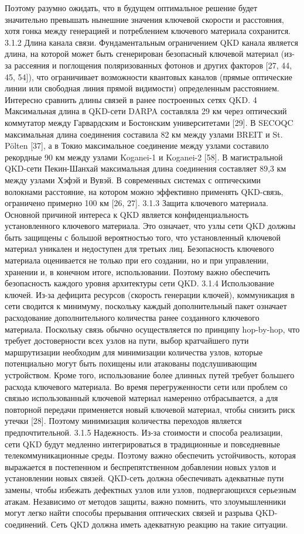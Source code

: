 Поэтому разумно ожидать, что в будущем оптимальное решение будет значительно превышать нынешние значения ключевой скорости и расстояния, хотя гонка между генерацией и потреблением ключевого материала сохранится.
3.1.2 Длина канала связи. Фундаментальным ограничением QKD канала является длина, на которой может быть сгенерирован безопасный ключевой материал (из-за рассеяния и поглощения поляризованных фотонов и других факторов [27, 44, 45, 54]), что ограничивает возможности квантовых каналов (прямые оптические линии или свободная линия прямой видимости) определенным расстоянием. Интересно сравнить длины связей в ранее построенных сетях QKD. 4 Максимальная длина в QKD-сети DARPA составляла 29 км через оптический коммутатор между Гарвардским и Бостонским университетами [29]. В SECOQC максимальная длина соединения составила 82 км между узлами BREIT и St. Pölten [37], а в Токио максимальное соединение между узлами составило рекордные 90 км между узлами Koganei-1 и Koganei-2 [58]. В магистральной QKD-сети Пекин-Шанхай максимальная длина соединения составляет 89,3 км между узлами Хэфэй и Вувэй.
В современных системах с оптическими волокнами расстояние, на котором можно эффективно применять QKD-связь, ограничено примерно 100 км [26, 27].
3.1.3 Защита ключевого материала. Основной причиной интереса к QKD является конфиденциальность установленного ключевого материала. Это означает, что узлы сети QKD должны быть защищены с большой вероятностью того, что установленный ключевой материал уникален и недоступен для третьих лиц. Безопасность ключевого материала оценивается не только при его создании, но и при управлении, хранении и, в конечном итоге, использовании. Поэтому важно обеспечить безопасность каждого уровня архитектуры сети QKD.
3.1.4 Использование ключей. Из-за дефицита ресурсов (скорость генерации ключей), коммуникация в сети сводится к минимуму, поскольку каждый дополнительный пакет означает расходование дополнительного количества ранее созданного ключевого материала. Поскольку связь обычно осуществляется по принципу hop-by-hop, что требует достоверности всех узлов на пути, выбор кратчайшего пути маршрутизации необходим для минимизации количества узлов, которые потенциально могут быть похищены или атакованы подслушивающим устройством. Кроме того, использование более длинных путей требует большего расхода ключевого материала. Во время перегруженности сети или проблем со связью использованный ключевой материал намеренно отбрасывается, а для повторной передачи применяется новый ключевой материал, чтобы снизить риск утечки [28]. Поэтому минимизация количества переходов является предпочтительной.
3.1.5 Надежность. Из-за стоимости и способа реализации, сети QKD будут медленно интегрироваться в традиционные и повседневные телекоммуникационные среды. Поэтому важно обеспечить устойчивость, которая выражается в постепенном и беспрепятственном добавлении новых узлов и установлении новых связей. QKD-сеть должна обеспечивать адекватные пути замены, чтобы избежать дефектных узлов или узлов, подвергающихся серьезным атакам. Независимо от методов защиты, важно помнить, что злоумышленники могут легко найти способы прерывания оптических связей и разрыва QKD-соединений. Сеть QKD должна иметь адекватную реакцию на такие ситуации.

